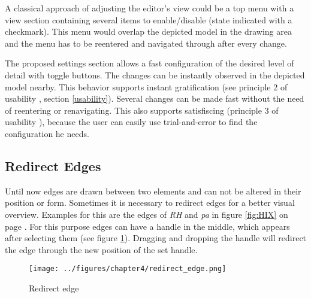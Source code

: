 \documentclass[twoside, openright, 12pt]{book}
\begin{document}
\noindent
A classical approach of adjusting the editor's view could be a top menu with a view section containing several items to enable/disable (state indicated with a checkmark).
This menu would overlap the depicted model in the drawing area and the menu has to be reentered and navigated through after every change.

The proposed settings section allows a fast configuration of the desired level of detail with toggle buttons.
The changes can be instantly observed in the depicted model nearby.
This behavior supports instant gratification (see principle 2 of usability \citep{Tidwell11}, section \ref{usability}).
Several changes can be made fast without the need of reentering or renavigating.
This also supports satisfiscing (principle 3 of usability \citep{Tidwell11}), because the user can easily use trial-and-error to find the configuration he needs.


\subsection{Redirect Edges}
\label{editor_extension_redirect_edges}
Until now edges are drawn between two elements and can not be altered in their position or form.
Sometimes it is necessary to redirect edges for a better visual overview.
Examples for this are the edges of \textit{RH} and \textit{pa} in figure \ref{fig:HIX} on page \pageref{fig:HIX}.
For this purpose edges can have a handle in the middle, which appears after selecting them (see figure \ref{fig:redirect_edge}).
Dragging and dropping the handle will redirect the edge through the new position of the set handle.

\begin{figure}[htb]
	\centering
	\texttt{[image: ../figures/chapter4/redirect\_edge.png]}
	\caption{Redirect edge}
	\label{fig:redirect_edge}
\end{figure}
\end{document}
